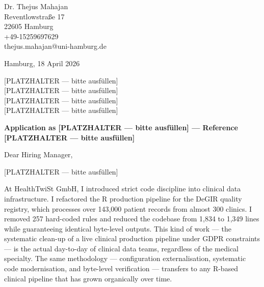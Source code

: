 \documentclass[11pt, a4paper]{article}
\begin{document}
\pagestyle{empty}

\begin{flushleft}
Dr. Thejus Mahajan\\
Reventlowstra{\ss}e 17\\
22605 Hamburg\\
+49-15259697629\\
thejus.mahajan@uni-hamburg.de
\end{flushleft}

\vspace{0.3cm}

\begin{flushright}
Hamburg, 18 April 2026
\end{flushright}

\vspace{0.3cm}

\begin{flushleft}
{[PLATZHALTER --- bitte ausf\"ullen]}\\
{[PLATZHALTER --- bitte ausf\"ullen]}\\
{[PLATZHALTER --- bitte ausf\"ullen]}\\
{[PLATZHALTER --- bitte ausf\"ullen]}
\end{flushleft}

\vspace{0.3cm}

\textbf{Application as [PLATZHALTER --- bitte ausf\"ullen] --- Reference [PLATZHALTER --- bitte ausf\"ullen]}

\vspace{0.3em}
Dear Hiring Manager,

{[PLATZHALTER --- bitte ausf\"ullen]}

At HealthTwiSt GmbH, I introduced strict code discipline into clinical data infrastructure. I refactored the R production pipeline for the DeGIR quality registry, which processes over 143,000 patient records from almost 300 clinics. I removed 257 hard-coded rules and reduced the codebase from 1,834 to 1,349 lines while guaranteeing identical byte-level outputs. This kind of work --- the systematic clean-up of a live clinical production pipeline under GDPR constraints --- is the actual day-to-day of clinical data teams, regardless of the medical specialty. The same methodology --- configuration externalisation, systematic code modernisation, and byte-level verification --- transfers to any R-based clinical pipeline that has grown organically over time.
\end{document}
